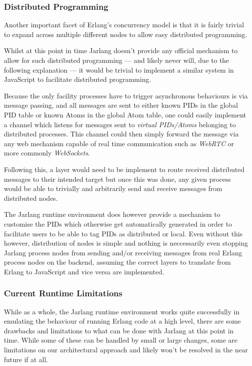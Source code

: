 \documentclass[twoside,12pt,titlepage,a4paper]{article}
\begin{document}
\subsubsection{Distributed Programming}

Another important facet of Erlang's concurrency model is that it is fairly trivial to expand across multiple different nodes to allow easy distributed programming.

Whilst at this point in time Jarlang doesn't provide any official mechanism to allow for such distributed programming --- and likely never will, due to the following explanation --- it would be trivial to implement a similar system in JavaScript to facilitate distributed programming. 

Because the only facility processes have to trigger asynchronous behaviours is via message passing, and all messages are sent to either known PIDs in the global PID table or known Atoms in the global Atom table, one could easily implement a channel which listens for messages sent to \textit{virtual PIDs/Atoms} belonging to distributed processes. This channel could then simply forward the message via any web mechanism capable of real time communication such as \textit{WebRTC} or more commonly \textit{WebSockets}. 

Following this, a layer would need to be implement to route received distributed messages to their intended target but once this was done, any given process would be able to trivially and arbitrarily send and receive messages from distributed nodes.

The Jarlang runtime environment does however provide a mechanism to customise the PIDs which otherwise get automatically generated in order to facilitate users to be able to tag PIDs as distributed or local. Even without this however, distribution of nodes is simple and nothing is neccessarily even stopping Jarlang process nodes from sending and/or receiving messages from real Erlang process nodes on the backend, assuming the correct layers to translate from Erlang to JavaScript and vice versa are implemented.

\subsubsection{Current Runtime Limitations}

While as a whole, the Jarlang runtime environment works quite successfully in emulating the behaviour of running Erlang code at a high level, there are some drawbacks and limitations to what can be done with Jarlang at this point in time. While some of these can be handled by small or large changes, some are limitations on our architectural approach and likely won't be resolved in the near future if at all.
\end{document}
